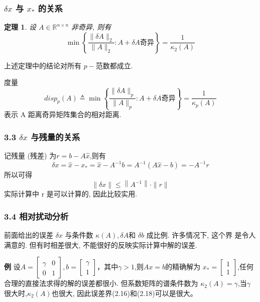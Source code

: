 \documentclass[notheorems,serif]{beamer}
\newcommand{\hei}[1]{{\HEI#1}}
\newtheorem{theorem}{\hei{定理}}
\begin{document}
\begin{frame}
\frametitle{$δx$ 与 $x_{*}$ 的关系}
\begin{theorem}
	设 $A ∈ \mathbb{R}^{n×n}$ 非奇异, 则有
	\begin{equation}
	\min \left\{\frac{\|\delta A\|_{2}}{\|A\|_{2}} : A+\delta A \text{奇异}\right\}=\frac{1}{\kappa_{2}(A)}
	\end{equation}
\end{theorem}

{\red{$\dagger$}}上述定理中的结论对所有 $p-$范数都成立.

{\red{$\dagger$}}度量
\begin{equation}
disp_p(A) \triangleq \min \left\{\frac{\|\delta A\|_{p}}{\|A\|_{p}} : A+\delta A \text{奇异}\right\}=\frac{1}{\kappa_{p}(A)}
\end{equation}	
表示 A 距离奇异矩阵集合的相对距离.
\end{frame}

\begin{frame}
\frametitle{3.3 \quad $δx$ 与残量的关系}
记残量 (残差) 为$r=b-A \hat{x}$,则有
\begin{equation}
\delta x=\hat{x}-x_{*}=\hat{x}-A^{-1} b=A^{-1}(A \hat{x}-b)=-A^{-1} r
\end{equation}
所以可得
\begin{equation}
\|\delta x\| \leq\left\|A^{-1}\right\| \cdot\|r\|
\end{equation}
实际计算中 r 是可以计算的, 因此比较实用.
\end{frame}

\begin{frame}
\frametitle{3.4 \quad 相对扰动分析}
前面给出的误差 $\delta x$ 与条件数 $\kappa(A), \delta A$和 $\delta b$ 成比例. 许多情况下, 这个界
是令人满意的. 但有时相差很大, 不能很好的反映实际计算中解的误差.

{\bfseries 例} 设$A=\left[\begin{array}{ll}{\gamma} & {0} \\ {0} & {1}\end{array}\right], b=\left[\begin{array}{l}{\gamma} \\ {1}\end{array}\right]$，其中$\gamma > 1$,则$Ax = b$的精确解为
$x_{*}=\left[\begin{array}{l}{1} \\ {1}\end{array}\right]$,任何合理的直接法求得的解的误差都很小. 但系数矩阵的谱条件数为 $\kappa_{2}(A)=\gamma$,当$\gamma$很大时,$\kappa_{2}(A)$也很大, 因此误差界(2.16)和(2.18)可以是很大。
\end{frame}
\end{document}
